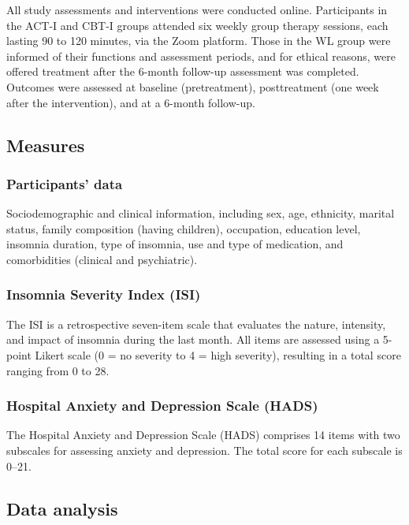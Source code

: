 \documentclass[
  english,
  man]{apa6}
\begin{document}
All study assessments and interventions were conducted online. Participants in the ACT-I and CBT-I groups attended six weekly group therapy sessions, each lasting 90 to 120 minutes, via the Zoom platform. Those in the WL group were informed of their functions and assessment periods, and for ethical reasons, were offered treatment after the 6-month follow-up assessment was completed. Outcomes were assessed at baseline (pretreatment), posttreatment (one week after the intervention), and at a 6-month follow-up.

\subsection{Measures}\label{measures}

\subsubsection{Participants' data}\label{participants-data}

Sociodemographic and clinical information, including sex, age, ethnicity, marital status, family composition (having children), occupation, education level, insomnia duration, type of insomnia, use and type of medication, and comorbidities (clinical and psychiatric).

\subsubsection{Insomnia Severity Index (ISI)}\label{insomnia-severity-index-isi}

The ISI is a retrospective seven-item scale that evaluates the nature, intensity, and impact of insomnia during the last month. All items are assessed using a 5-point Likert scale (0 = no severity to 4 = high severity), resulting in a total score ranging from 0 to 28.

\subsubsection{Hospital Anxiety and Depression Scale (HADS)}\label{hospital-anxiety-and-depression-scale-hads}

The Hospital Anxiety and Depression Scale (HADS) comprises 14 items with two subscales for assessing anxiety and depression. The total score for each subscale is 0--21.

\subsection{Data analysis}\label{data-analysis}
\end{document}
